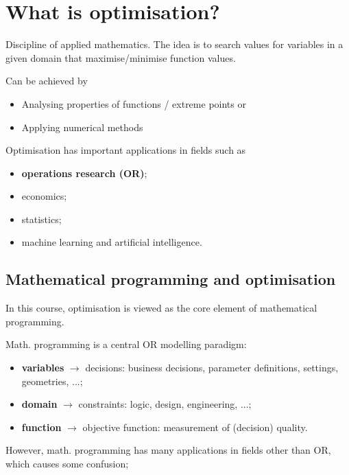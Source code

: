\section{What is optimisation?}


Discipline of applied mathematics. The idea is to search values for \alert{variables}\hspace{-1pt} in a given \alert{domain} that\hspace{-1pt} maximise/minimise\hspace{-1pt} \alert{function values}. 

Can be achieved by 
\begin{itemize}
	\item Analysing properties of functions \hspace{-1pt}/ extreme points or
	\item Applying numerical methods 
\end{itemize}


Optimisation has important applications in fields such as 

\begin{itemize}
	\item {\bf operations research (OR)};
	\item economics;
	\item statistics; 
	\item machine learning and artificial intelligence.
\end{itemize}



\subsection{Mathematical programming and optimisation}


In this course, optimisation is viewed as the core element of \alert{mathematical programming}.

Math. programming is a central OR modelling paradigm:
\begin{itemize}
	\item {\bf variables} $\rightarrow$ decisions: business decisions, parameter definitions, settings, geometries, ...;
	\item {\bf domain} $\rightarrow$ constraints: logic, design, engineering, ...;
	\item {\bf function} $\rightarrow$ objective function: measurement of (decision) quality. 
\end{itemize}

However, math. programming has many applications in fields other than OR, \alert{which causes some confusion}; 


